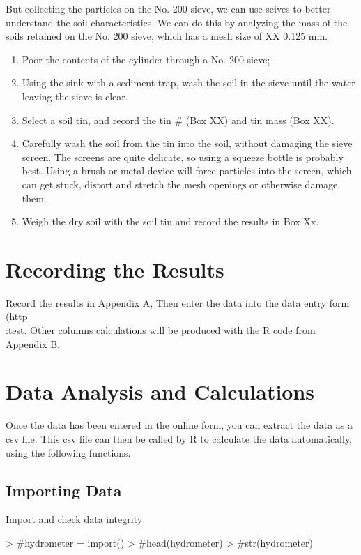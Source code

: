 \documentclass[12pt]{../SOP3_alpha}
\begin{document}
\NP But collecting the particles on the No. 200 sieve, we can use seives to better understand the soil characteristics. We can do this by analyzing the mass of the soils retained on the No. 200 sieve, which has a mesh size of XX 0.125 mm.  

\begin{enumerate}
	\item Poor the contents of the cylinder through a No. 200 sieve;
	\item Using the sink with a sediment trap, wash the soil in the sieve until the water leaving the sieve is clear. 
	\item Select a soil tin, and record the tin \# (Box XX) and tin mass (Box XX). 
	\item Carefully wash the soil from the tin into the soil, without damaging the sieve screen. The screens are quite delicate, so using a squeeze bottle is probably best. Using a brush or metal device will force particles into the screen, which can get stuck, distort and stretch the mesh openings or otherwise damage them. 
	\item Weigh the dry soil with the soil tin and record the results in Box Xx.
\end{enumerate}

\section{Recording the Results}

Record the results in Appendix A, Then enter the data into the data entry form (\href{test}{http\\:test}. Other columns calculations will be produced with the R code from Appendix B.  


\section{Data Analysis and Calculations}

Once the data has been entered in the online form, you can extract the data as a csv file. This csv file can then be called by R to calculate the data automatically, using the following functions. 

\subsection*{Importing Data}

Import and check data integrity

\begin{Schunk}
\begin{Sinput}
> #hydrometer = import()
> #head(hydrometer)
> #str(hydrometer)
\end{Sinput}
\end{Schunk}
\end{document}
